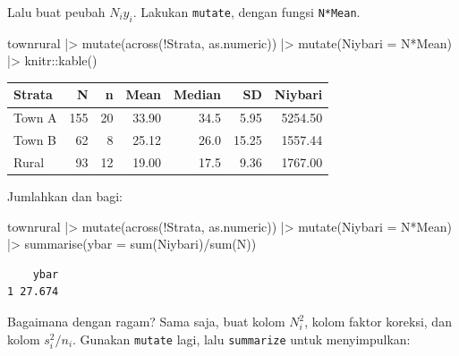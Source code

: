\documentclass[
  letterpaper,
  DIV=11,
  numbers=noendperiod]{scrreprt}
\newenvironment{Shaded}{\begin{snugshade}}{\end{snugshade}}
\newcommand{\AttributeTok}[1]{\textcolor[rgb]{0.40,0.45,0.13}{#1}}
\newcommand{\FunctionTok}[1]{\textcolor[rgb]{0.28,0.35,0.67}{#1}}
\newcommand{\NormalTok}[1]{\textcolor[rgb]{0.00,0.23,0.31}{#1}}
\newcommand{\SpecialCharTok}[1]{\textcolor[rgb]{0.37,0.37,0.37}{#1}}
\begin{document}
Lalu buat peubah \(N_iy_i\). Lakukan \texttt{mutate}, dengan fungsi
\texttt{N*Mean}.

\begin{Shaded}
\begin{Highlighting}[]
\NormalTok{townrural }\SpecialCharTok{|\textgreater{}} 
    \FunctionTok{mutate}\NormalTok{(}\FunctionTok{across}\NormalTok{(}\SpecialCharTok{!}\NormalTok{Strata, as.numeric)) }\SpecialCharTok{|\textgreater{}}
    \FunctionTok{mutate}\NormalTok{(}\AttributeTok{Niybari =}\NormalTok{ N}\SpecialCharTok{*}\NormalTok{Mean) }\SpecialCharTok{|\textgreater{}}\NormalTok{ knitr}\SpecialCharTok{::}\FunctionTok{kable}\NormalTok{()}
\end{Highlighting}
\end{Shaded}

\begin{longtable}[]{@{}lrrrrrr@{}}
\toprule()
Strata & N & n & Mean & Median & SD & Niybari \\
\midrule()
\endhead
Town A & 155 & 20 & 33.90 & 34.5 & 5.95 & 5254.50 \\
Town B & 62 & 8 & 25.12 & 26.0 & 15.25 & 1557.44 \\
Rural & 93 & 12 & 19.00 & 17.5 & 9.36 & 1767.00 \\
\bottomrule()
\end{longtable}

Jumlahkan dan bagi:

\begin{Shaded}
\begin{Highlighting}[]
\NormalTok{townrural }\SpecialCharTok{|\textgreater{}} 
    \FunctionTok{mutate}\NormalTok{(}\FunctionTok{across}\NormalTok{(}\SpecialCharTok{!}\NormalTok{Strata, as.numeric)) }\SpecialCharTok{|\textgreater{}}
    \FunctionTok{mutate}\NormalTok{(}\AttributeTok{Niybari =}\NormalTok{ N}\SpecialCharTok{*}\NormalTok{Mean) }\SpecialCharTok{|\textgreater{}} 
    \FunctionTok{summarise}\NormalTok{(}\AttributeTok{ybar =} \FunctionTok{sum}\NormalTok{(Niybari)}\SpecialCharTok{/}\FunctionTok{sum}\NormalTok{(N))}
\end{Highlighting}
\end{Shaded}

\begin{verbatim}
    ybar
1 27.674
\end{verbatim}

Bagaimana dengan ragam? Sama saja, buat kolom \(N_i^2\), kolom faktor
koreksi, dan kolom \(s_i^2/n_i\). Gunakan \texttt{mutate} lagi, lalu
\texttt{summarize} untuk menyimpulkan:
\end{document}
